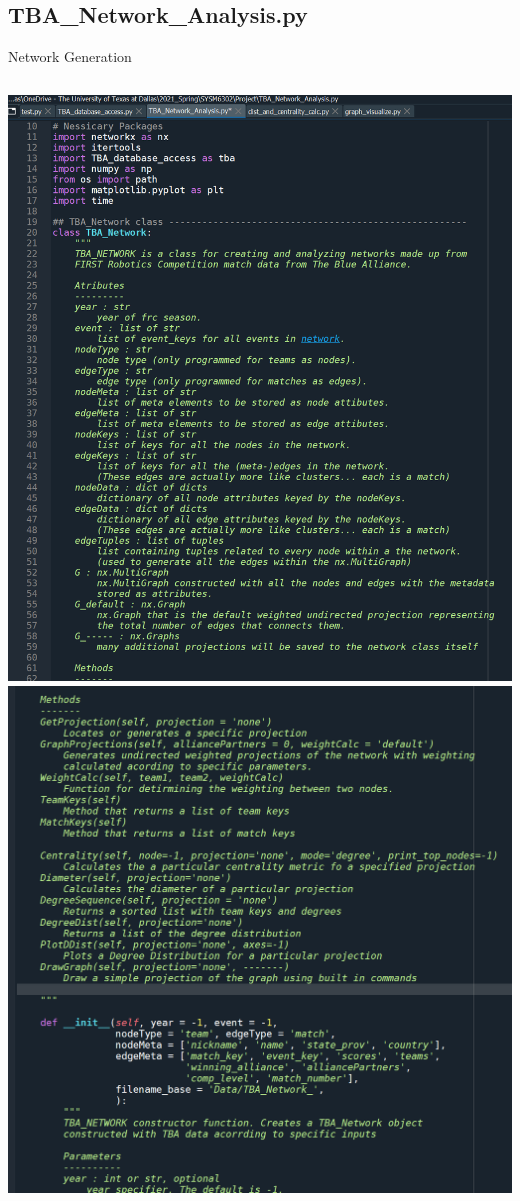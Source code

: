 \documentclass[10pt]{beamer}
\begin{document}
\subsection{TBA\_Network\_Analysis.py}
\begin{frame}{Network Generation}
	\begin{columns}
			\includegraphics[width=\columnwidth]{Images/tba_network_analysis_screenshot1}
			\includegraphics[width=\columnwidth]{Images/tba_network_analysis_screenshot2}
	\end{columns}
\end{frame}
\end{document}
